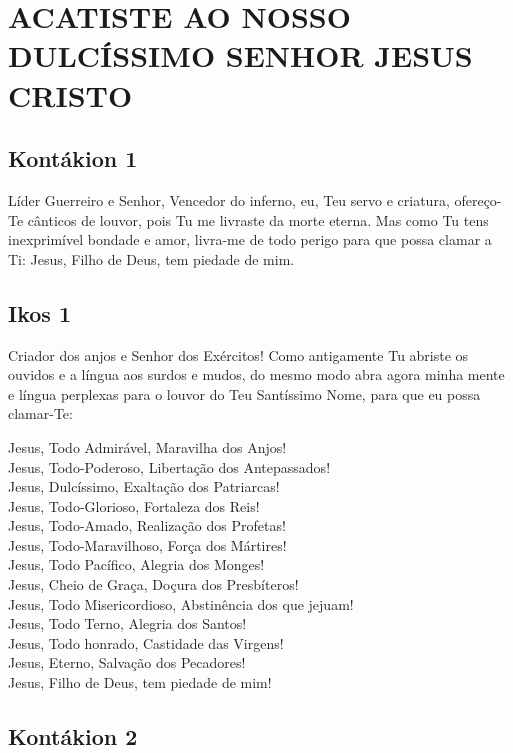 \documentclass{subfiles}
\begin{document}
\chapter{ACATISTE AO NOSSO DULCÍSSIMO SENHOR JESUS CRISTO}

\section*{Kontákion 1}

Líder Guerreiro e Senhor, Vencedor do inferno, eu, Teu servo e
criatura, ofereço-Te cânticos de louvor, pois Tu me livraste da morte eterna.
Mas como Tu tens inexprimível bondade e amor, livra-me de todo perigo para
que possa clamar a Ti: Jesus, Filho de Deus, tem piedade de mim.

\section*{Ikos 1}

Criador dos anjos e Senhor dos Exércitos! Como antigamente Tu
abriste os ouvidos e a língua aos surdos e mudos, do mesmo modo abra agora
minha mente e língua perplexas para o louvor do Teu Santíssimo Nome, para
que eu possa clamar-Te:

Jesus, Todo Admirável, Maravilha dos Anjos! \\
Jesus, Todo-Poderoso, Libertação dos Antepassados! \\
Jesus, Dulcíssimo, Exaltação dos Patriarcas! \\
Jesus, Todo-Glorioso, Fortaleza dos Reis! \\
Jesus, Todo-Amado, Realização dos Profetas! \\
Jesus, Todo-Maravilhoso, Força dos Mártires! \\
Jesus, Todo Pacífico, Alegria dos Monges! \\
Jesus, Cheio de Graça, Doçura dos Presbíteros! \\
Jesus, Todo Misericordioso, Abstinência dos que jejuam! \\
Jesus, Todo Terno, Alegria dos Santos! \\
Jesus, Todo honrado, Castidade das Virgens! \\
Jesus, Eterno, Salvação dos Pecadores! \\
Jesus, Filho de Deus, tem piedade de mim!

\section*{Kontákion 2}
\end{document}
